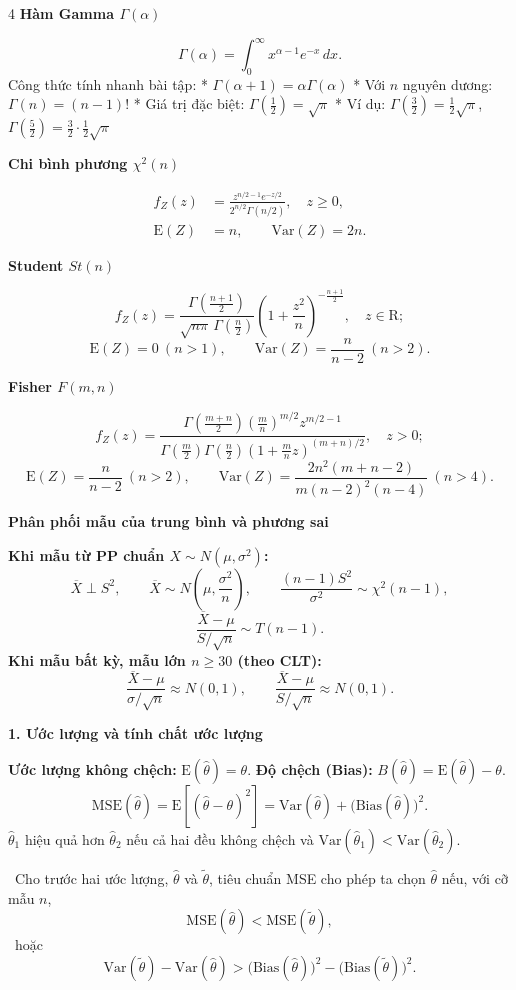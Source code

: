 \documentclass[a4paper,landscape]{article}
\newcommand{\sect}[1]{%
  \vspace{0.7pt}\noindent
  \colorbox{black!10}{\parbox{\dimexpr\linewidth-2\fboxsep\relax}{\bfseries #1}}%
  \vspace{0.2pt}\par}
\newcommand{\subsect}[1]{\vspace{0.2pt}\textbf{#1}\par}
\begin{document}
\begin{multicols*}{4}
\subsect{Hàm Gamma $\Gamma(\alpha)$}
\[
 \Gamma(\alpha) = \int_0^\infty x^{\alpha-1} e^{-x} \, dx.
\]
Công thức tính nhanh bài tập:
* $\Gamma(\alpha+1) = \alpha\Gamma(\alpha)$
* Với $n$ nguyên dương: $\Gamma(n) = (n-1)!$
* Giá trị đặc biệt: $\Gamma\left(\frac12\right) = \sqrt{\pi}$
* Ví dụ: $\Gamma\left(\frac32\right) = \frac12\sqrt{\pi}$, $\Gamma\left(\frac52\right) = \frac32 \cdot \frac12\sqrt{\pi}$

\subsect{Chi bình phương $\chi^2(n)$}
\[
 \begin{aligned}
 f_Z(z)&=\frac{z^{n/2-1}e^{-z/2}}{2^{n/2}\Gamma(n/2)},\quad z\geq0,\\
 \mathrm E(Z)&=n,\qquad \mathrm{Var}(Z)=2n.
 \end{aligned}
\]

\subsect{Student $St(n)$}
\[
 f_Z(z)=\frac{\Gamma\!\left(\frac{n+1}{2}\right)}
 {\sqrt{n\pi}\,\Gamma\!\left(\frac n2\right)}
 \left(1+\frac{z^2}{n}\right)^{-\frac{n+1}{2}},\quad z\in\mathrm R;
\]
\[
 \mathrm E(Z)=0\ (n>1),\qquad
 \mathrm{Var}(Z)=\frac n{n-2}\ (n>2).
\]

\subsect{Fisher $F(m,n)$}
\[
 f_Z(z)=\frac{\Gamma\!\left(\frac{m+n}{2}\right)
 \left(\frac mn\right)^{m/2}z^{m/2-1}}
 {\Gamma\!\left(\frac m2\right)\Gamma\!\left(\frac n2\right)
 \left(1+\frac mn z\right)^{(m+n)/2}},\quad z>0;
\]
\[
 \mathrm E(Z)=\frac n{n-2}\ (n>2),\qquad
 \mathrm{Var}(Z)=\frac{2n^2(m+n-2)}{m(n-2)^2(n-4)}\ (n>4).
\]


\sect{Phân phối mẫu của trung bình và phương sai}
\textbf{Khi mẫu từ PP chuẩn $X\sim N(\mu,\sigma^2)$:}
\[
 \overline X\perp S^2,\qquad
 \overline X\sim N\!\left(\mu,\frac{\sigma^2}{n}\right),\qquad
 \frac{(n-1)S^2}{\sigma^2}\sim\chi^2(n-1),
\]
\[
 \frac{\overline X-\mu}{S/\sqrt n}\sim T(n-1).
\]
\textbf{Khi mẫu bất kỳ, mẫu lớn $n\geq30$ (theo CLT):}
\[
 \frac{\overline X-\mu}{\sigma/\sqrt n}\approx N(0,1),\qquad
 \frac{\overline X-\mu}{S/\sqrt n}\approx N(0,1).
\]

\columnbreak
\sect{1. Ước lượng và tính chất ước lượng}
\textbf{Ước lượng không chệch:} $\mathrm E(\hat\theta)=\theta$.
\quad\textbf{Độ chệch (Bias):}
$B(\hat\theta)=\mathrm E(\hat\theta)-\theta$.
\[
 \mathrm{MSE}(\hat\theta)=\mathrm E[(\hat\theta-\theta)^2]
 =\mathrm{Var}(\hat\theta)+\bigl(\mathrm{Bias}(\hat\theta)\bigr)^2.
\]
$\hat\theta_1$ hiệu quả hơn $\hat\theta_2$ nếu cả hai đều không chệch và
$\mathrm{Var}(\hat\theta_1)<\mathrm{Var}(\hat\theta_2)$.

\textbullet\ Cho trước hai ước lượng, $\hat\theta$ và $\tilde\theta$, tiêu chuẩn
MSE cho phép ta chọn $\hat\theta$ nếu, với cỡ mẫu $n$,
\[
 \mathrm{MSE}(\hat\theta)<\mathrm{MSE}(\tilde\theta),
\]
\textbullet\ hoặc
\[
 \mathrm{Var}(\tilde\theta)-\mathrm{Var}(\hat\theta)>
 \bigl(\mathrm{Bias}(\hat\theta)\bigr)^2-
 \bigl(\mathrm{Bias}(\tilde\theta)\bigr)^2.
\]


\end{multicols*}
\end{document}
